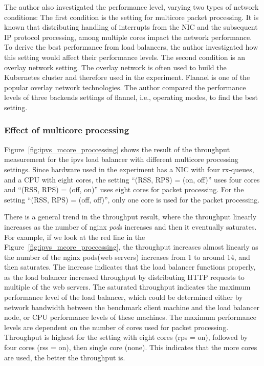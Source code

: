 The author also investigated the performance level, varying two types of network conditions:
The first condition is the setting for multicore packet processing.
It is known that distributing handling of interrupts from the NIC and the subsequent IP protocol processing, among multiple cores impact the network performance.
To derive the best performance from load balancers, the author investigated how this setting would affect their performance levels.
The second condition is an overlay network setting\cite{Sill2016,Marmol2015}.
The overlay network is often used to build the Kubernetes cluster and therefore used in the experiment.
Flannel\cite{CoreOSFlannel} is one of the popular overlay network technologies. 
The author compared the performance levels of three backends settings\cite{CoreOSFlannelBackend} of flannel, i.e., operating modes, to find the best setting.

\FloatBarrier

\subsubsection{Effect of multicore processing}

Figure~\ref{fig:ipvs_mcore_proccessing} shows the result of the throughput measurement for the ipvs load balancer with different multicore processing settings.
Since hardware used in the experiment has a NIC with four rx-queues, and a CPU with eight cores,
the setting \enquote{(RSS, RPS) = (on, off)} uses four cores and \enquote{(RSS, RPS) = (off, on)} uses eight cores for packet processing.
For the setting \enquote{(RSS, RPS) = (off, off)}, only one core is used for the packet processing.

There is a general trend in the throughput result, where the throughput linearly increases as the number of nginx {\em pod}s increases and then it eventually saturates.
For example, if we look at the red line in the Figure~\ref{fig:ipvs_mcore_proccessing}, the throughput increases almost linearly as the number of the nginx pods(web servers) increases from 1 to around 14, and then saturates.
The increase indicates that the load balancer functions properly, as the load balancer increased throughput by distributing HTTP requests to multiple of the web servers.
%
The saturated throughput indicates the maximum performance level of the load balancer, which could be determined either by network bandwidth between the benchmark client machine and the load balancer node, or CPU performance levels of these machines.
%
The maximum performance levels are dependent on the number of cores used for packet processing.
Throughput is highest for the setting with eight cores (rps = on), followed by four cores (rss = on), then single core (none).
This indicates that the more cores are used, the better the throughput is.

